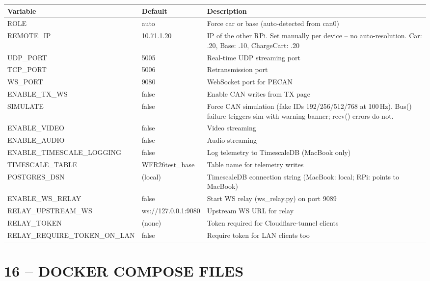 \documentclass[a5paper,10pt]{article}
\begin{document}
\noindent
\begin{tabularx}{\linewidth}{p{40mm}p{20mm}X}
  \toprule
  \textbf{Variable} & \textbf{Default} & \textbf{Description} \\
  \midrule
  ROLE & auto & Force car or base (auto-detected from can0) \\
  REMOTE\_IP & 10.71.1.20 & IP of the other RPi. Set manually per device -- no auto-resolution. Car: .20, Base: .10, ChargeCart: .20 \\
  UDP\_PORT & 5005 & Real-time UDP streaming port \\
  TCP\_PORT & 5006 & Retransmission port \\
  WS\_PORT & 9080 & WebSocket port for PECAN \\
  ENABLE\_TX\_WS & false & Enable CAN writes from TX page \\
  SIMULATE & false & Force CAN simulation (fake IDs 192/256/512/768 at 100\,Hz). Bus() failure triggers sim with warning banner; recv() errors do not. \\
  ENABLE\_VIDEO & false & Video streaming \\
  ENABLE\_AUDIO & false & Audio streaming \\
  ENABLE\_TIMESCALE\_LOGGING & false & Log telemetry to TimescaleDB (MacBook only) \\
  TIMESCALE\_TABLE & WFR26test\_base & Table name for telemetry writes \\
  POSTGRES\_DSN & (local) & TimescaleDB connection string (MacBook: local; RPi: points to MacBook) \\
  ENABLE\_WS\_RELAY & false & Start WS relay (ws\_relay.py) on port 9089 \\
  RELAY\_UPSTREAM\_WS & ws://127.0.0.1:9080 & Upstream WS URL for relay \\
  RELAY\_TOKEN & (none) & Token required for Cloudflare-tunnel clients \\
  RELAY\_REQUIRE\_TOKEN\_ON\_LAN & false & Require token for LAN clients too \\
  \bottomrule
\end{tabularx}
\vspace{2mm}

\section*{16 -- DOCKER COMPOSE FILES}
\end{document}

